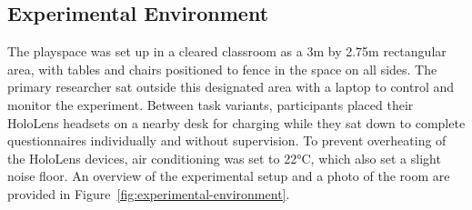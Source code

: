 \subsection{Experimental Environment}\label{sec:experimental-environment}
The playspace was set up in a cleared classroom as a 3m by 2.75m rectangular area, with tables and chairs positioned to fence in the space on all sides. The primary researcher sat outside this designated area with a laptop to control and monitor the experiment. Between task variants, participants placed their HoloLens headsets on a nearby desk for charging while they sat down to complete questionnaires individually and without supervision. To prevent overheating of the HoloLens devices, air conditioning was set to 22°C, which also set a slight noise floor. An overview of the experimental setup and a photo of the room are provided in Figure~\ref{fig:experimental-environment}.

